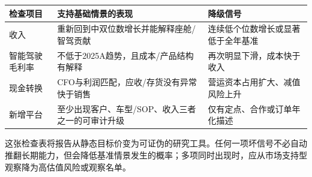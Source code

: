\begin{exhibitbox}[中报必须回答的经营问题]
\small
\begin{tabularx}{\textwidth}{L{3cm}Y Y}
\toprule
检查项目 & 支持基础情景的表现 & 降级信号 \\
\midrule
收入 & 重新回到中双位数增长并能解释座舱/智驾贡献 & 连续低个位数增长或显著低于全年基准 \\
智能驾驶毛利率 & 不低于2025A趋势，且成本/产品结构有解释 & 再次明显下滑，成本快于收入 \\
现金转换 & CFO与利润匹配，应收/存货没有异常快于销售 & 营运资本占用扩大、减值风险上升 \\
新增平台 & 至少出现客户、车型/SOP、收入三者之一的可审计升级 & 仅有定点、合作或订单年化描述 \\
\bottomrule
\end{tabularx}
\end{exhibitbox}

这张检查表将报告从静态目标价变为可证伪的研究工具。任何一项坏信号不必自动推翻长期能力，但会降低基准情景发生的概率；多项同时出现时，应从市场支持型观察降为高估值风险或观察名单。
